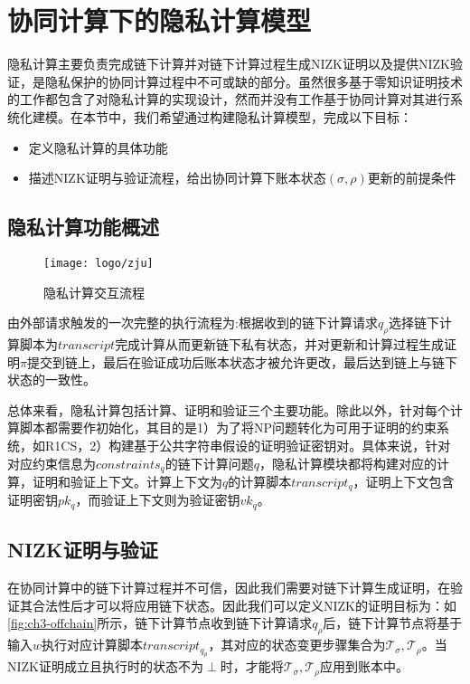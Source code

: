 \section{协同计算下的隐私计算模型}
隐私计算主要负责完成链下计算并对链下计算过程生成NIZK证明以及提供NIZK验证，是隐私保护的协同计算过程中不可或缺的部分。虽然很多基于零知识证明技术的工作都包含了对隐私计算的实现设计，然而并没有工作基于协同计算对其进行系统化建模。在本节中，我们希望通过构建隐私计算模型，完成以下目标：
\begin{itemize}
    \setlength{\itemsep}{0pt}
    \setlength{\parsep}{0pt}
    \setlength{\parskip}{0pt}
    \item 定义隐私计算的具体功能
    \item 描述NIZK证明与验证流程，给出协同计算下账本状态$(\sigma, \rho)$更新的前提条件
\end{itemize}
\subsection{隐私计算功能概述}
\begin{figure}[htbp]
    \centering
    \texttt{[image: logo/zju]}
    \caption{\label{fig:ch3-offchain}隐私计算交互流程}
\end{figure}
由外部请求触发的一次完整的执行流程为:根据收到的链下计算请求$q_\rho$选择链下计算脚本为$transcript$完成计算从而更新链下私有状态，并对更新和计算过程生成证明$\pi$提交到链上，最后在验证成功后账本状态才被允许更改，最后达到链上与链下状态的一致性。

总体来看，隐私计算包括计算、证明和验证三个主要功能。除此以外，针对每个计算脚本都需要作初始化，其目的是1）为了将NP问题转化为可用于证明的约束系统，如R1CS，2）构建基于公共字符串假设的证明验证密钥对。具体来说，针对对应约束信息为$constraints_q$的链下计算问题$q$，隐私计算模块都将构建对应的计算，证明和验证上下文。计算上下文为$q$的计算脚本$transcript_q$，证明上下文包含证明密钥$pk_q$，而验证上下文则为验证密钥$vk_q$。

\subsection{NIZK证明与验证}
在协同计算中的链下计算过程并不可信，因此我们需要对链下计算生成证明，在验证其合法性后才可以将应用链下状态。因此我们可以定义NIZK的证明目标为：如\autoref{fig:ch3-offchain}所示，链下计算节点收到链下计算请求$q_\rho$后，链下计算节点将基于输入$w$执行对应计算脚本$transcript_{q_\rho}$，其对应的状态变更步骤集合为$\mathcal{T}_\sigma, \mathcal{T}_\rho$。当NIZK证明成立且执行时的状态不为$\perp$时，才能将$\mathcal{T}_\sigma, \mathcal{T}_\rho$应用到账本中。

